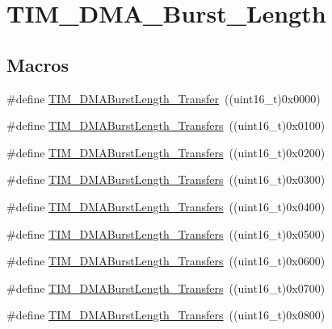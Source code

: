 \hypertarget{group___t_i_m___d_m_a___burst___length}{}\section{T\+I\+M\+\_\+\+D\+M\+A\+\_\+\+Burst\+\_\+\+Length}
\label{group___t_i_m___d_m_a___burst___length}
\subsection*{Macros}
\begin{DoxyCompactItemize}
\item 
\#define \mbox{\hyperlink{group___t_i_m___d_m_a___burst___length_gab87f91f1c5583b9888cb6bb37fc639e2}{T\+I\+M\+\_\+\+D\+M\+A\+Burst\+Length\+\_\+Transfer}}~((uint16\+\_\+t)0x0000)
\item 
\#define \mbox{\hyperlink{group___t_i_m___d_m_a___burst___length_ga829504c3e8c90a9445f6a223bc3034f8}{T\+I\+M\+\_\+\+D\+M\+A\+Burst\+Length\+\_\+Transfers}}~((uint16\+\_\+t)0x0100)
\item 
\#define \mbox{\hyperlink{group___t_i_m___d_m_a___burst___length_ga3a99863a0925e0cc9a11b91aade66f11}{T\+I\+M\+\_\+\+D\+M\+A\+Burst\+Length\+\_\+Transfers}}~((uint16\+\_\+t)0x0200)
\item 
\#define \mbox{\hyperlink{group___t_i_m___d_m_a___burst___length_ga84bfeb309593a1ac580e233bf7514b36}{T\+I\+M\+\_\+\+D\+M\+A\+Burst\+Length\+\_\+Transfers}}~((uint16\+\_\+t)0x0300)
\item 
\#define \mbox{\hyperlink{group___t_i_m___d_m_a___burst___length_ga44f8aa51fbe8887a5f3c37a0e776902c}{T\+I\+M\+\_\+\+D\+M\+A\+Burst\+Length\+\_\+Transfers}}~((uint16\+\_\+t)0x0400)
\item 
\#define \mbox{\hyperlink{group___t_i_m___d_m_a___burst___length_ga8be40a21654eea72e9c1bf9922675b22}{T\+I\+M\+\_\+\+D\+M\+A\+Burst\+Length\+\_\+Transfers}}~((uint16\+\_\+t)0x0500)
\item 
\#define \mbox{\hyperlink{group___t_i_m___d_m_a___burst___length_gaf2ae83bd73b0e92b73e5ebfc11f9bfad}{T\+I\+M\+\_\+\+D\+M\+A\+Burst\+Length\+\_\+Transfers}}~((uint16\+\_\+t)0x0600)
\item 
\#define \mbox{\hyperlink{group___t_i_m___d_m_a___burst___length_ga8a760d7114425596736b0ecdbe5fdea6}{T\+I\+M\+\_\+\+D\+M\+A\+Burst\+Length\+\_\+Transfers}}~((uint16\+\_\+t)0x0700)
\item 
\#define \mbox{\hyperlink{group___t_i_m___d_m_a___burst___length_ga98b208205c133557a9d67a0921559a66}{T\+I\+M\+\_\+\+D\+M\+A\+Burst\+Length\+\_\+Transfers}}~((uint16\+\_\+t)0x0800)

\end{DoxyCompactItemize}
